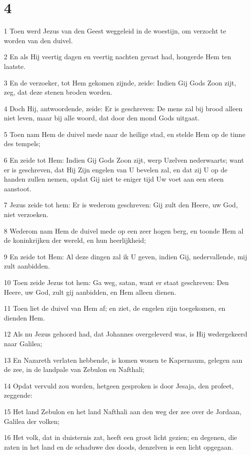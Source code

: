 \chapter{4}

\par 1 Toen werd Jezus van den Geest weggeleid in de woestijn, om verzocht te worden van den duivel.
\par 2 En als Hij veertig dagen en veertig nachten gevast had, hongerde Hem ten laatste.
\par 3 En de verzoeker, tot Hem gekomen zijnde, zeide: Indien Gij Gods Zoon zijt, zeg, dat deze stenen broden worden.
\par 4 Doch Hij, antwoordende, zeide: Er is geschreven: De mens zal bij brood alleen niet leven, maar bij alle woord, dat door den mond Gods uitgaat.
\par 5 Toen nam Hem de duivel mede naar de heilige stad, en stelde Hem op de tinne des tempels;
\par 6 En zeide tot Hem: Indien Gij Gods Zoon zijt, werp Uzelven nederwaarts; want er is geschreven, dat Hij Zijn engelen van U bevelen zal, en dat zij U op de handen zullen nemen, opdat Gij niet te eniger tijd Uw voet aan een steen aanstoot.
\par 7 Jezus zeide tot hem: Er is wederom geschreven: Gij zult den Heere, uw God, niet verzoeken.
\par 8 Wederom nam Hem de duivel mede op een zeer hogen berg, en toonde Hem al de koninkrijken der wereld, en hun heerlijkheid;
\par 9 En zeide tot Hem: Al deze dingen zal ik U geven, indien Gij, nedervallende, mij zult aanbidden.
\par 10 Toen zeide Jezus tot hem: Ga weg, satan, want er staat geschreven: Den Heere, uw God, zult gij aanbidden, en Hem alleen dienen.
\par 11 Toen liet de duivel van Hem af; en ziet, de engelen zijn toegekomen, en dienden Hem.
\par 12 Als nu Jezus gehoord had, dat Johannes overgeleverd was, is Hij wedergekeerd naar Galilea;
\par 13 En Nazareth verlaten hebbende, is komen wonen te Kapernaum, gelegen aan de zee, in de landpale van Zebulon en Nafthali;
\par 14 Opdat vervuld zou worden, hetgeen gesproken is door Jesaja, den profeet, zeggende:
\par 15 Het land Zebulon en het land Nafthali aan den weg der zee over de Jordaan, Galilea der volken;
\par 16 Het volk, dat in duisternis zat, heeft een groot licht gezien; en degenen, die zaten in het land en de schaduwe des doods, denzelven is een licht opgegaan.
